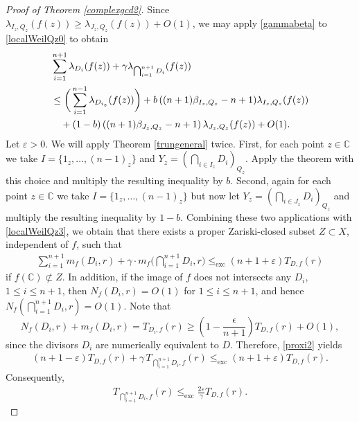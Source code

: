 \documentclass[10pt]{amsart}
\numberwithin{equation}{section}
\theoremstyle{plain}
\theoremstyle{definition}
\begin{document}
\begin{proof}[Proof of Theorem \ref{complexgcd2}]
Since $\lambda_{   I_z,Q_z }(f(z))\ge \lambda_{ J_z,Q_z }(f(z))+O(1)$,
we may apply \eqref{gammabeta} to \eqref{localWeilQz0} to obtain
\begin{align}\label{localWeilQz3}
 & \sum_{i=1}^{n+1}\lambda_{ D_{i}}(f(z))+ \gamma \lambda_{\bigcap_{i=1}^{n+1}D_{i}} (f(z))  \notag\\
 &\le \bigg(\sum_{i=1}^{n-1}\lambda_{D_{i_z}}(f(z)) \bigg)+b\left((n+1)\beta_{I_z,Q_z}-n+1)\lambda_{I_z,Q_z}(f(z)\right) \notag\\
&\quad+(1-b)\left((n+1)\beta_{J_z,Q_z}-n+1\right)\lambda_{J_z,Q_z}(f(z))+O(1). 
\end{align}
Let $\varepsilon>0$.  We will apply Theorem \ref{trungeneral} twice.
First, for each point $z\in\mathbb C$ we take $I=\{1_z,\ldots,(n-1)_z \}$ and $Y_z=(\bigcap_{i \in I_z} D_{i})_{Q_z} $.  Apply the theorem with this choice and multiply the resulting inequality by $b$.
Second, again for each point $z\in\mathbb C$ we take  $I=\{1_z,\ldots,(n-1)_z \}$ but now let $Y_z=(\bigcap_{i \in J_z} D_{i})_{Q_z} $   and multiply the resulting inequality by $1-b$.
Combining these two applications with \eqref{localWeilQz3}, we obtain that there exists a proper Zariski-closed subset  $Z\subset X$, independent of $f$, such that  
\begin{align}\label{proxi2}
  \sum_{i=1}^{n+1}m_f(D_i,r)  +\gamma\cdot m_f\bigg( {\bigcap_{i=1}^{n+1} }  D_{i} ,r\bigg)   
    \leq_{\operatorname{exc}} (n+1+\varepsilon)T_{D,f}(r) 
\end{align}
if $f(\mathbb{C})\not\subset Z$. 
In addition, if the image of $f$ does not intersects any $D_i$, $1\le i\le n+1$, then  $N_f(D_i,r) =O(1)$ for  $1\le i\le n+1$, and hence $N_f({\bigcap_{i=1}^{n+1} }  D_{i},r) =O(1)$.
 Note that 
\begin{equation*}
    N_f(D_i,r)+ m_f(D_i,r) =T_{D_i,f}(r)  
\ge \left(1-\frac{\epsilon}{n+1}\right) T_{D,f}(r)+O(1),
\end{equation*}
since the divisors $D_i$ are numerically equivalent to $D$. Therefore, \eqref{proxi2} yields
\begin{align}\label{ht}
(n+1-\varepsilon)T_{D,f}(r)   
+\gamma\, T_{\bigcap_{i=1}^{n+1}D_{i},f}(r)   
\leq_{\operatorname{exc}} (n+1+\varepsilon)T_{D,f}(r).
\end{align}
 Consequently,
\begin{align*} 
 T_{{\bigcap_{i=1}^{n+1} }  D_{i},f}(r)   
    \leq_{\operatorname{exc}} \frac{2\varepsilon}{\gamma} T_{D,f}(r).
\end{align*}
\end{proof}
\end{document}
